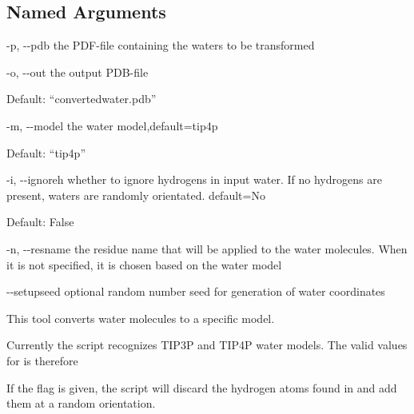\documentclass[letterpaper,10pt,english]{sphinxmanual}
\begin{document}
\subsection{Named Arguments}
\label{\detokenize{tools:Named Arguments}}\begin{optionlist}{3cm}
\item [-p, -{-}pdb]  
the PDF-file containing the waters to be transformed
\item [-o, -{-}out]  
the output PDB-file

Default: “convertedwater.pdb”
\item [-m, -{-}model]  
the water model,default=tip4p

Default: “tip4p”
\item [-i, -{-}ignoreh]  
whether to ignore hydrogens in input water. If no hydrogens are present, waters are randomly orientated. default=No

Default: False
\item [-n, -{-}resname]  
the residue name that will be applied to the water molecules. When it is not specified, it is chosen based on the water model
\item [-{-}setupseed]  
optional random number seed for generation of water coordinates
\end{optionlist}


%
\begin{sphinxVerbatim}[commandchars=\\\{\}]
  
    
   
\end{sphinxVerbatim}


This tool converts water molecules to a specific model.

Currently the script recognizes TIP3P and TIP4P water models. The valid values for  is therefore 

If the  flag is given, the script will discard the hydrogen atoms found in  and add them at a random orientation.
\end{document}
